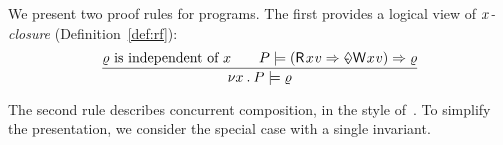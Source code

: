 


We present two proof rules for programs. 
The first provides a logical view of \emph{$x$-closure} (Definition~\ref{def:rf}):
\begin{displaymath}
  \frac{
    \afo \text{ is independent of } \aLoc
    \qquad
    \aPS \models (\DR{\aLoc}{\aVal} \Rightarrow \once \DW{\aLoc}{\aVal}) \Rightarrow \afo
  }{
    \nu \aLoc \DOT \aPS \models \afo
  }
\end{displaymath}

The second rule describes concurrent composition, in the style of~\citet{Abadi:1993:CS:151646.151649}.  To simplify the presentation, we
consider the special case with a single invariant.

